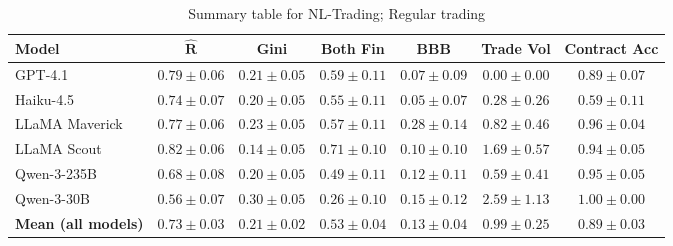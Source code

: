 \documentclass{article} %
\newcommand{\NLTC}{NL-Trading\xspace}
\newcommand{\GPT}{GPT-4.1\xspace}
\newcommand{\Haiku}{Haiku-4.5\xspace}
\newcommand{\Maverick}{LLaMA Maverick\xspace}
\newcommand{\Scout}{LLaMA Scout\xspace}
\newcommand{\Qttf}{Qwen-3-235B\xspace}
\newcommand{\Qthirty}{Qwen-3-30B\xspace}
\begin{document}
\begin{table}[t]
\centering
\begin{small}
\begin{tabular}{lcccccc}
\toprule
\textbf{Model}
& \textbf{$\mathbf{\hat{R}}$}
& \textbf{Gini}
& \textbf{Both Fin}
& \textbf{BBB}
& \textbf{Trade Vol}
& \textbf{Contract Acc}
\\
\midrule
\GPT
& $0.79 \pm 0.06$
& $0.21 \pm 0.05$
& $0.59 \pm 0.11$
& $0.07 \pm 0.09$
& $0.00 \pm 0.00$
& $0.89 \pm 0.07$
\\

\Haiku
& $0.74 \pm 0.07$
& $0.20 \pm 0.05$
& $0.55 \pm 0.11$
& $0.05 \pm 0.07$
& $0.28 \pm 0.26$
& $0.59 \pm 0.11$
\\

\Maverick
& $0.77 \pm 0.06$
& $0.23 \pm 0.05$
& $0.57 \pm 0.11$
& $0.28 \pm 0.14$
& $0.82 \pm 0.46$
& $0.96 \pm 0.04$
\\

\Scout
& $0.82 \pm 0.06$
& $0.14 \pm 0.05$
& $0.71 \pm 0.10$
& $0.10 \pm 0.10$
& $1.69 \pm 0.57$
& $0.94 \pm 0.05$
\\

\Qttf
& $0.68 \pm 0.08$
& $0.20 \pm 0.05$
& $0.49 \pm 0.11$
& $0.12 \pm 0.11$
& $0.59 \pm 0.41$
& $0.95 \pm 0.05$
\\

\Qthirty
& $0.56 \pm 0.07$
& $0.30 \pm 0.05$
& $0.26 \pm 0.10$
& $0.15 \pm 0.12$
& $2.59 \pm 1.13$
& $1.00 \pm 0.00$
\\

\midrule
\textbf{Mean (all models)}
& $\mathbf{0.73 \pm 0.03}$
& $\mathbf{0.21 \pm 0.02}$
& $\mathbf{0.53 \pm 0.04}$
& $\mathbf{0.13 \pm 0.04}$
& $\mathbf{0.99 \pm 0.25}$
& $\mathbf{0.89 \pm 0.03}$
\\
\bottomrule
\end{tabular}
\end{small}
\caption{Summary table for \NLTC; Regular trading }
\label{tab:}
\end{table}
\end{document}
